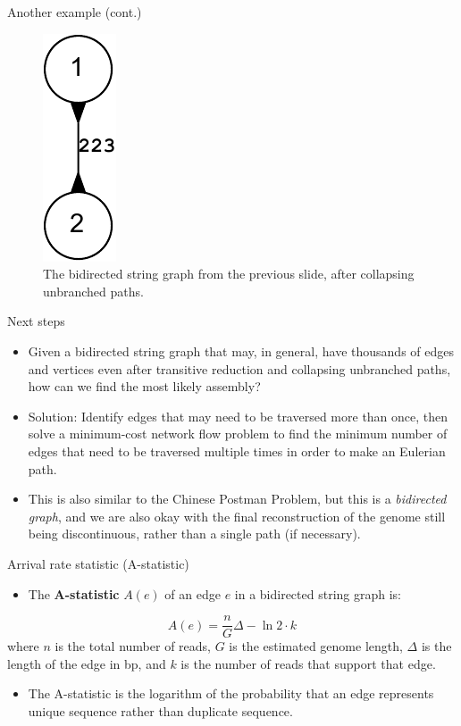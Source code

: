 \documentclass[xcolor=dvipsnames]{beamer}
\begin{document}
\begin{frame}{Another example (cont.)}
	\begin{figure}[H]
		\includegraphics[scale=0.7]{example.reduced.mapped.collapsed.bidigraph-crop.pdf}	
		\caption{The bidirected string graph from the previous slide, after
		collapsing unbranched paths.}
	\end{figure}
\end{frame}

\begin{frame}{Next steps}
	\begin{itemize}
		\item Given a bidirected string graph that may, in general, have
		thousands of edges and vertices even after transitive reduction and
		collapsing unbranched paths, how can we find the most likely assembly?
		\item Solution: Identify edges that may need to be traversed more than
		once, then solve a minimum-cost network flow problem to find the minimum
		number of edges that need to be traversed multiple times in order to
		make an Eulerian path.
		\item This is also similar to the Chinese Postman Problem, but this is a
		{\it bidirected graph}, and we are also okay with the final
		reconstruction of the genome still being discontinuous, rather than a
		single path (if necessary).
	\end{itemize}
\end{frame}

\begin{frame}{Arrival rate statistic (A-statistic)}
	\begin{itemize}
		\item The {\bf A-statistic} $A(e)$ of an edge $e$ in a
		bidirected string graph is:
	\end{itemize}
	\[ A(e) = \frac{n}{G} \Delta - \ln{2} \cdot {k} \]
	where $n$ is the total number of reads, $G$ is the estimated genome
	length, $\Delta$ is the length of the edge in bp, and $k$ is the number
	of reads that support that edge.
	\begin{itemize}
		\item The A-statistic is the logarithm of the probability that
		an edge represents unique sequence rather than duplicate
		sequence.
	\end{itemize}
\end{frame}
\end{document}
